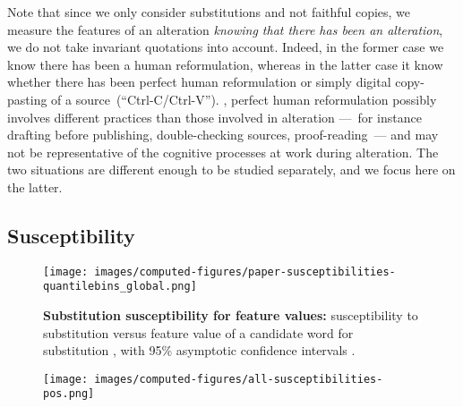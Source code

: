 Note that since we only consider substitutions and not faithful copies, we measure the features of an alteration \emph{knowing that there has been an alteration},  we do not take invariant quotations into account.
Indeed, in the former case we know there has been a human reformulation, whereas in the latter case it  know whether there has been perfect human reformulation or simply digital copy-pasting of a source~(``{\sc Ctrl-C}/{\sc Ctrl-V}'').
, perfect human reformulation possibly involves different practices than those involved in alteration ---~for instance drafting before publishing, double-checking sources, proof-reading~--- and may not be representative of the cognitive processes at work during alteration.
The two situations are different enough to be studied separately, and we focus here on the latter.

\subsection{Susceptibility}

\begin{figure*}[!th]
    \centering
    \texttt{[image: images/computed-figures/paper-susceptibilities-quantilebins\_global.png]}
    \caption{\textbf{Substitution susceptibility for feature values:}
    susceptibility to substitution versus feature value of a candidate word for substitution , with 95\% asymptotic confidence intervals .
    }
    \label{fig:feature-susceptibilities-global}
\end{figure*}

\begin{figure}[h]
    \centering
    \texttt{[image: images/computed-figures/all-susceptibilities-pos.png]}
    \caption{
    }
    \label{fig:pos-susceptibilities}
\end{figure}

